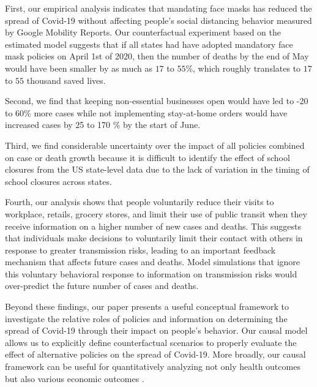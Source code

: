 \documentclass[11pt,reqno,letter]{amsart}
\theoremstyle{definition}
\begin{document}
First, our empirical analysis indicates that mandating face masks has reduced the spread of Covid-19 without affecting people's social distancing behavior measured by Google Mobility Reports. Our counterfactual experiment based on the estimated model suggests that if all states had have adopted mandatory face mask policies on April 1st of 2020, then the number of deaths by the end of May would have been smaller by as much as  $17$ to $55$\%, which roughly translates to $17$ to $55$ thousand saved lives.

Second, we find that keeping non-essential businesses open would have led to -20 to 60\% more cases  while not implementing stay-at-home orders would have increased cases by 25 to 170 \% by the start of June. %

Third, we find considerable uncertainty over  the impact of all policies combined on case or death growth because it is difficult to identify the effect of school closures from the US state-level data due to the lack of variation in the timing of school closures across states.

Fourth, our analysis shows that people voluntarily reduce their visits to workplace, retails, grocery stores, and limit their use of public transit when they receive  information on a higher number of new cases and deaths. This suggests that individuals make decisions to voluntarily limit their contact with others in response to greater transmission risks, leading to an important feedback mechanism that affects future cases and deaths. Model simulations that ignore this voluntary behavioral response to information on transmission risks would over-predict the future number of cases and deaths.

Beyond these findings, our paper presents a useful conceptual framework to investigate the relative roles of policies and information on determining the spread of Covid-19 through their impact on people's behavior. Our causal model allows us  to explicitly define counterfactual scenarios to properly evaluate the effect of alternative policies on the spread of Covid-19. %
 More broadly, our  causal framework can be useful for quantitatively analyzing not only health outcomes but also various economic outcomes \citep{bartik2020, chetty2020real}.
\end{document}
